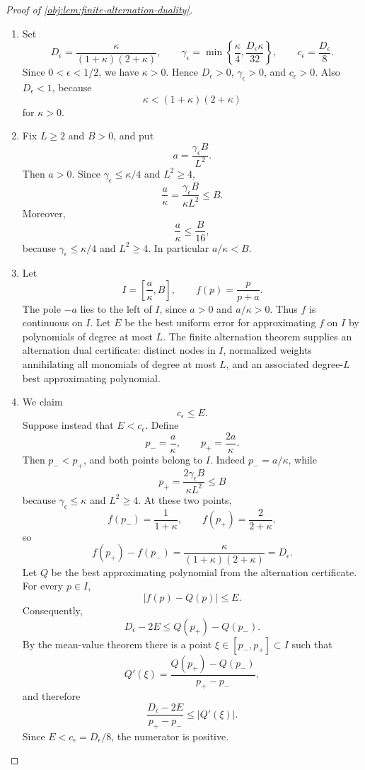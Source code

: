 \documentclass[11pt]{article}
\begin{document}
\begin{proof}[Proof of \cref{obj:lem:finite-alternation-duality}]
\begin{enumerate}
\item Set
\[
D_\epsilon=\frac{\kappa}{(1+\kappa)(2+\kappa)},\qquad
\gamma_\epsilon=\min\left\{\frac{\kappa}{4},\frac{D_\epsilon\kappa}{32}\right\},\qquad
c_\epsilon=\frac{D_\epsilon}{8}.
\]
Since \(0<\epsilon<1/2\), we have \(\kappa>0\). Hence \(D_\epsilon>0\), \(\gamma_\epsilon>0\), and \(c_\epsilon>0\). Also \(D_\epsilon<1\), because
\[
\kappa<(1+\kappa)(2+\kappa)
\]
for \(\kappa>0\). %

\item Fix \(L\ge2\) and \(B>0\), and put
\[
a=\frac{\gamma_\epsilon B}{L^2}.
\]
Then \(a>0\). Since \(\gamma_\epsilon\le \kappa/4\) and \(L^2\ge4\),
\[
\frac{a}{\kappa}
=\frac{\gamma_\epsilon B}{\kappa L^2}
\le B.
\]
Moreover,
\[
\frac{a}{\kappa}\le \frac{B}{16},
\]
because \(\gamma_\epsilon\le \kappa/4\) and \(L^2\ge4\). In particular \(a/\kappa<B\). %

\item Let
\[
I=\left[\frac{a}{\kappa},B\right],
\qquad
f(p)=\frac{p}{p+a}.
\]
The pole \(-a\) lies to the left of \(I\), since \(a>0\) and \(a/\kappa>0\). Thus \(f\) is continuous on \(I\). Let \(E\) be the best uniform error for approximating \(f\) on \(I\) by polynomials of degree at most \(L\). The finite alternation theorem supplies an alternation dual certificate: distinct nodes in \(I\), normalized weights annihilating all monomials of degree at most \(L\), and an associated degree-\(L\) best approximating polynomial. %

\item We claim
\[
c_\epsilon\le E.
\]
Suppose instead that \(E<c_\epsilon\). Define
\[
p_-=\frac{a}{\kappa},\qquad p_+=\frac{2a}{\kappa}.
\]
Then \(p_-<p_+\), and both points belong to \(I\). Indeed \(p_-=a/\kappa\), while
\[
p_+=\frac{2\gamma_\epsilon B}{\kappa L^2}\le B
\]
because \(\gamma_\epsilon\le \kappa\) and \(L^2\ge4\). At these two points,
\[
f(p_-)=\frac{1}{1+\kappa},\qquad
f(p_+)=\frac{2}{2+\kappa},
\]
so
\[
f(p_+)-f(p_-)
=\frac{\kappa}{(1+\kappa)(2+\kappa)}
=D_\epsilon.
\]
Let \(Q\) be the best approximating polynomial from the alternation certificate. For every \(p\in I\),
\[
|f(p)-Q(p)|\le E.
\]
Consequently,
\[
D_\epsilon-2E
\le Q(p_+)-Q(p_-).
\]
By the mean-value theorem there is a point \(\xi\in[p_-,p_+]\subset I\) such that
\[
Q'(\xi)=\frac{Q(p_+)-Q(p_-)}{p_+-p_-},
\]
and therefore
\[
\frac{D_\epsilon-2E}{p_+-p_-}\le |Q'(\xi)|.
\]
Since \(E<c_\epsilon=D_\epsilon/8\), the numerator is positive. %


\end{enumerate}
\end{proof}
\end{document}
